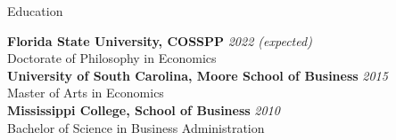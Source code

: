 \documentclass{resume} %
\begin{document}

\begin{rSection}{Education}

{\bf Florida State University, COSSPP} \hfill {\em 2022 (expected)} \\ 
Doctorate of Philosophy in Economics \\

{\bf University of South Carolina, Moore School of Business} \hfill {\em 2015} \\
Master of Arts in Economics \\

{\bf Mississippi College, School of Business} \hfill {\em 2010}\\
Bachelor of Science in Business Administration

\end{rSection}

\end{document}
